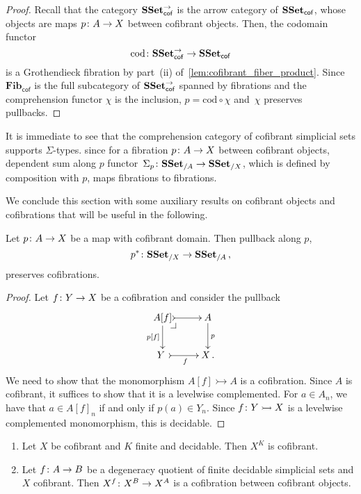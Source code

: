 \documentclass[reqno,10pt,a4paper,oneside,draft]{amsart}
\begin{document}
\begin{proof} Recall that the category $\mathbf{SSet}^\to_{\mathsf{cof}}$ is the arrow category of $\mathbf{SSet}_{\mathsf{cof}}$, whose objects are
maps $p \colon A \to X$ between cofibrant objects. Then, the codomain
functor 
\[
\mathrm{cod} \colon \mathbf{SSet}^{\to}_{\mathsf{cof}} \to \mathbf{SSet}_{\mathsf{cof}}
\] 
is a Grothendieck fibration by part~(ii) of~\cref{lem:cofibrant_fiber_product}. 
Since $\mathbf{Fib}_{ \mathsf{cof}}$ is the full subcategory of $\mathbf{SSet}^{\to}_{\mathsf{cof}}$ spanned by fibrations and the comprehension functor $\chi$ is the inclusion, $p = \mathrm{cod} \circ \chi$
and~$\chi$ preserves pullbacks.
\end{proof}



\begin{remark} \label{thm:sigma-types} It is immediate to see that the comprehension category of cofibrant simplicial sets supports $\Sigma$-types. since for a fibration $p \colon A \to X$ between cofibrant objects, dependent sum along $p$  functor~$\Sigma_p \colon \mathbf{SSet}_{/A} \to \mathbf{SSet}_{/X}$, which is defined by
composition with $p$, maps fibrations to fibrations.
\end{remark}

\medskip


We conclude this section with some auxiliary results on cofibrant objects and cofibrations
that will be useful in the following. 


\begin{proposition} \label{thm:cof-pbk}  Let $p \colon A \to X$  be a map with cofibrant domain.
Then pullback along $p$, \[
p^* \colon \mathbf{SSet}_{/X} \to \mathbf{SSet}_{/A} \, , 
\]
preserves cofibrations. 
\end{proposition}

\begin{proof} Let $f \colon Y \to X$ be a cofibration and consider the pullback
\[
\xymatrix{
A[f]  \ar@{>->}[r] \drpullback \ar[d]_-{p[f]} &  A \ar[d]^{p} \\
Y \ar@{>->}[r]_{f} \ & X \, .}
\]
We need to show that the monomorphism $A[f] \rightarrowtail A$ is a cofibration. 
Since $A$ is cofibrant, it suffices to show that it is a levelwise complemented. For $a \in A_n$, we have that $a \in A[f]_n$ if and only if $p(a) \in Y_n$. Since $f \colon Y \rightarrowtail X$ is a levelwise complemented monomorphism, this is decidable.
\end{proof} 




\begin{lemma} \label{prop:X^kCofibrant}  \hfill 
\begin{enumerate}[$(i)$]
\item Let $X$ be cofibrant and $K$ finite and decidable. Then $X^K$ is cofibrant.
\item Let $f \colon A \rightarrow B$ be a degeneracy quotient of finite decidable simplicial sets and $X$  cofibrant. Then $X^f \colon X^B \rightarrow X^A$ is a cofibration between cofibrant objects.
\end{enumerate}
\end{lemma}
\end{document}

